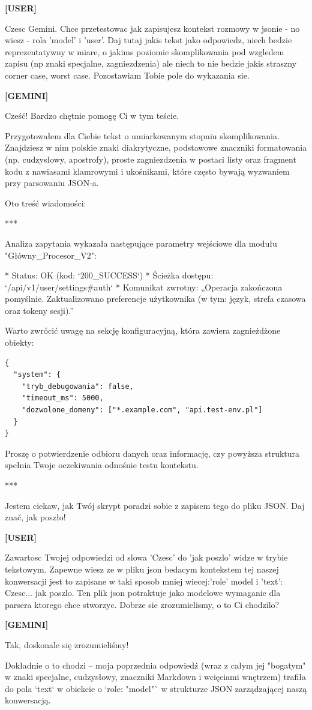 \documentclass[10pt,a4paper]{article}
\newcommand{\UserTurn}{\textbf{[USER]}\par\medskip}
\newcommand{\ModelTurn}{\textbf{[GEMINI]}\par\medskip}
\newcommand{\Separator}{\par\vspace{4pt}\noindent{\color{rulecolor}\rule{\linewidth}{0.4pt}}\par\vspace{6pt}}
\begin{document}
\UserTurn
Czesc Gemini. Chce przetestowac jak zapisujesz kontekst rozmowy w jsonie - no wiesz - rola 'model' i 'user'. Daj tutaj jakis tekst jako odpowiedz, niech bedzie reprezentatywny w miare, o jakims poziomie skomplikowania pod wzgledem zapisu (np  znaki specjalne, zagniezdzenia) ale niech to nie bedzie  jakis straszny corner case, worst case. Pozostawiam Tobie pole do wykazania sie.
\Separator
\ModelTurn
Cześć! Bardzo chętnie pomogę Ci w tym teście. 

Przygotowałem dla Ciebie tekst o umiarkowanym stopniu skomplikowania. Znajdziesz w nim polskie znaki diakrytyczne, podstawowe znaczniki formatowania (np. cudzysłowy, apostrofy), proste zagniezdzenia w postaci listy oraz fragment kodu z nawiasami klamrowymi i ukośnikami, które często bywają wyzwaniem przy parsowaniu JSON-a.

Oto treść wiadomości:

***

Analiza zapytania wykazała następujące parametry wejściowe dla modułu "Główny\_Procesor\_V2":

* Status: OK (kod: `200\_SUCCESS`)
* Ścieżka dostępu: `/api/v1/user/settings\#auth`
* Komunikat zwrotny: „Operacja zakończona pomyślnie. Zaktualizowano preferencje użytkownika (w tym: język, strefa czasowa oraz tokeny sesji).”

Warto zwrócić uwagę na sekcję konfiguracyjną, która zawiera zagnieżdżone obiekty:
\begin{verbatim}
{
  "system": {
    "tryb_debugowania": false,
    "timeout_ms": 5000,
    "dozwolone_domeny": ["*.example.com", "api.test-env.pl"]
  }
}
\end{verbatim}

Proszę o potwierdzenie odbioru danych oraz informację, czy powyższa struktura spełnia Twoje oczekiwania odnośnie testu kontekstu.

***

Jestem ciekaw, jak Twój skrypt poradzi sobie z zapisem tego do pliku JSON. Daj znać, jak poszło!
\Separator
\UserTurn
Zawartosc Twojej odpowiedzi od slowa 'Czesc' do 'jak poszlo' widze w trybie tekstowym. Zapewne wiesz ze w pliku json bedacym kontekstem tej naszej konwersacji jest to zapisane w taki sposob mniej wiecej:'role' model i 'text': Czesc... jak poszlo. Ten plik json potraktuje jako modelowe wymaganie dla parsera ktorego chce stworzyc. Dobrze sie zrozumielismy, o to Ci chodzilo?
\Separator
\ModelTurn
Tak, doskonale się zrozumieliśmy! 

Dokładnie o to chodzi – moja poprzednia odpowiedź (wraz z całym jej "bogatym" w znaki specjalne, cudzysłowy, znaczniki Markdown i wcięciami wnętrzem) trafiła do pola `text` w obiekcie o `role: "model"` w strukturze JSON zarządzającej naszą konwersacją.
\end{document}
